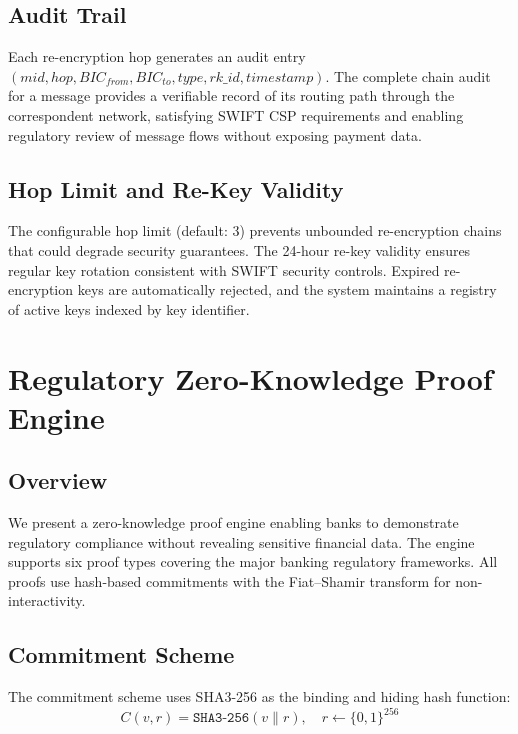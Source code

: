 \documentclass[conference,10pt]{IEEEtran}
\newcommand{\SHA}{\texttt{SHA3-256}}
\begin{document}
\subsection{Audit Trail}

Each re-encryption hop generates an audit entry $(mid, hop, BIC_{from}, BIC_{to}, type, rk\_id, timestamp)$. The complete chain audit for a message provides a verifiable record of its routing path through the correspondent network, satisfying SWIFT CSP requirements and enabling regulatory review of message flows without exposing payment data.

\subsection{Hop Limit and Re-Key Validity}

The configurable hop limit (default: 3) prevents unbounded re-encryption chains that could degrade security guarantees. The 24-hour re-key validity ensures regular key rotation consistent with SWIFT security controls. Expired re-encryption keys are automatically rejected, and the system maintains a registry of active keys indexed by key identifier.

\section{Regulatory Zero-Knowledge Proof Engine}

\subsection{Overview}

We present a zero-knowledge proof engine enabling banks to demonstrate regulatory compliance without revealing sensitive financial data. The engine supports six proof types covering the major banking regulatory frameworks. All proofs use hash-based commitments with the Fiat--Shamir transform for non-interactivity.

\subsection{Commitment Scheme}

The commitment scheme uses SHA3-256 as the binding and hiding hash function:
\begin{equation}
C(v, r) = \SHA(v \| r), \quad r \leftarrow \{0,1\}^{256}
\label{eq:commitment}
\end{equation}
\end{document}

